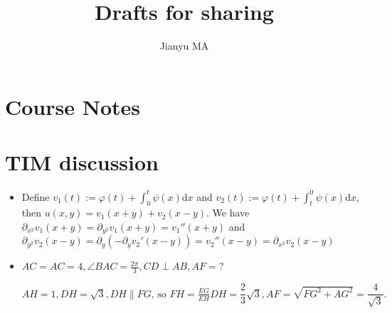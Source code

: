 \documentclass[]{article}
\title{Drafts for sharing}
\author{Jianyu MA}
\theoremstyle{remark}
\begin{document}
\maketitle


\section{Course Notes}
\section{TIM discussion}
\begin{itemize}
	\item Define $ v_1(t) :=\varphi(t) + \int_0^{t} \psi(x) \mathrm{d} x
	$ and $ v_2(t) :=\varphi(t) + \int_{t}^{0} \psi(x) \mathrm{d} x
	$, then $ u(x,y) = v_1(x+y) + v_2(x-y) $. We have $ \partial_{x^2}{v_1(x+y)} = \partial_{y^2}{v_1(x+y)} = v_1''(x+y)$ and $ \partial_{y^2}{v_2(x-y)} = \partial_{y}(-\partial_{y}v_2'(x-y))=v_2''(x-y)= \partial_{x^2}{v_2(x-y)}$
	\item $ AC = AC = 4,\angle BAC = \frac{2\pi}{3}, CD\perp AB, AF=? $

	$ AH = 1, DH = \sqrt 3, DH \parallel FG \text{, so } FH = \frac{EG}{EH} DH = \dfrac{2}{3} \sqrt 3, AF = \sqrt{FG^2 + AG^2}=\dfrac{4}{\sqrt 3}. $
\end{itemize}
\end{document}
